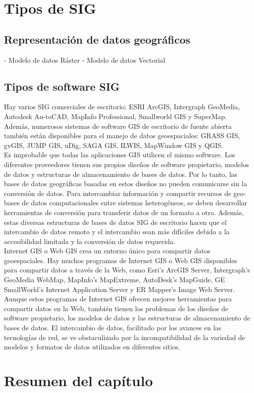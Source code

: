 \section{Tipos de SIG}


\subsection{Representación de datos geográficos}

- Modelo de datos Ráster
- Modelo de datos Vectorial

\subsection{Tipos de software SIG}


Hay varios SIG comerciales de escritorio: ESRI ArcGIS, Intergraph GeoMedia, Autodesk Au-toCAD, MapInfo Professional, Smallworld GIS y SuperMap.\\

Además, numerosos sistemas de software GIS de escritorio de fuente abierta también están disponibles para el manejo de datos geoespaciales: GRASS GIS, gvGIS, JUMP GIS, uDig, SAGA GIS, ILWIS, MapWindow GIS y QGIS.\\

Es improbable que todas las aplicaciones GIS utilicen el mismo software. Los diferentes proveedores tienen sus propios diseños de software propietario, modelos de datos y estructuras de almacenamiento de bases de datos. Por lo tanto, las bases de datos geográficas basadas en estos diseños no pueden comunicarse sin la conversión de datos. Para intercambiar información y compartir recursos de geo-bases de datos computacionales entre sistemas heterogéneos, se deben desarrollar herramientas de conversión para transferir datos de un formato a otro. Además, estas diversas estructuras de bases de datos SIG de escritorio hacen que el intercambio de datos remoto y el intercambio sean más difíciles debido a la accesibilidad limitada y la conversión de datos requerida.\\

Internet GIS o Web GIS crea un entorno único para compartir datos geoespaciales. Hay muchos programas de Internet GIS o Web GIS disponibles para compartir datos a través de la Web, como Esri’s ArcGIS Server, Intergraph’s GeoMedia WebMap, MapInfo’s MapExtreme, AutoDesk’s MapGuide, GE SmallWorld’s Internet Application Server y ER Mapper’s Image Web Server.\\

Aunque estos programas de Internet GIS ofrecen mejores herramientas para compartir datos en la Web, también tienen los problemas de los diseños de software propietario, los modelos de datos y las estructuras de almacenamiento de bases de datos. El intercambio de datos, facilitado por los avances en las tecnologías de red, se ve obstaculizado por la incompatibilidad de la variedad de modelos y formatos de datos utilizados en diferentes sitios.


\section{Resumen del capítulo}


